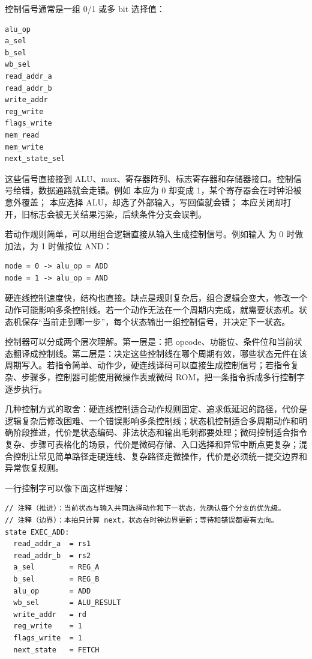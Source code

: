 控制信号通常是一组 0/1 或多 bit 选择值：

\begin{lstlisting}
alu_op
a_sel
b_sel
wb_sel
read_addr_a
read_addr_b
write_addr
reg_write
flags_write
mem_read
mem_write
next_state_sel
\end{lstlisting}

这些信号直接接到 ALU、mux、寄存器阵列、标志寄存器和存储器接口。控制信号给错，数据通路就会走错。例如  本应为 0 却变成 1，某个寄存器会在时钟沿被意外覆盖； 本应选择 ALU，却选了外部输入，写回值就会错； 本应关闭却打开，旧标志会被无关结果污染，后续条件分支会误判。

若动作规则简单，可以用组合逻辑直接从输入生成控制信号。例如输入  为 0 时做加法，为 1 时做按位 AND：

\begin{lstlisting}
mode = 0 -> alu_op = ADD
mode = 1 -> alu_op = AND
\end{lstlisting}

硬连线控制速度快，结构也直接。缺点是规则复杂后，组合逻辑会变大，修改一个动作可能影响多条控制线。若一个动作无法在一个周期内完成，就需要状态机。状态机保存“当前走到哪一步”，每个状态输出一组控制信号，并决定下一状态。

控制器可以分成两个层次理解。第一层是：把 opcode、功能位、条件位和当前状态翻译成控制线。第二层是：决定这些控制线在哪个周期有效，哪些状态元件在该周期写入。若指令简单、动作少，硬连线译码可以直接生成控制信号；若指令复杂、步骤多，控制器可能使用微操作表或微码 ROM，把一条指令拆成多行控制字逐步执行。

几种控制方式的取舍：硬连线控制适合动作规则固定、追求低延迟的路径，代价是逻辑复杂后修改困难、一个错误影响多条控制线；状态机控制适合多周期动作和明确阶段推进，代价是状态编码、非法状态和输出毛刺都要处理；微码控制适合指令复杂、步骤可表格化的场景，代价是微码存储、入口选择和异常中断点更复杂；混合控制让常见简单路径走硬连线、复杂路径走微操作，代价是必须统一提交边界和异常恢复规则。

一行控制字可以像下面这样理解：

\begin{lstlisting}
// 注释（推进）：当前状态与输入共同选择动作和下一状态，先确认每个分支的优先级。
// 注释（边界）：本拍只计算 next，状态在时钟边界更新；等待和错误都要有去向。
state EXEC_ADD:
  read_addr_a  = rs1
  read_addr_b  = rs2
  a_sel        = REG_A
  b_sel        = REG_B
  alu_op       = ADD
  wb_sel       = ALU_RESULT
  write_addr   = rd
  reg_write    = 1
  flags_write  = 1
  next_state   = FETCH
\end{lstlisting}

